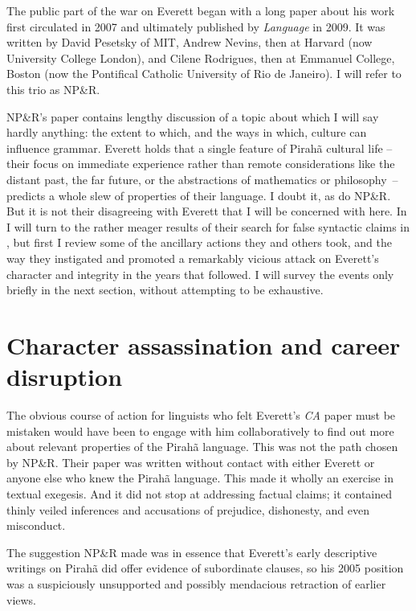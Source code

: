 \documentclass[output=paper,colorlinks,citecolor=brown
]{langscibook}
\begin{document}
The public part of the war on Everett began with a long paper about
his work first circulated in 2007 and ultimately published by
\textit{Language} in 2009. It was written by David Pesetsky of MIT,
Andrew Nevins, then at Harvard (now University College London), and
Cilene Rodrigues, then at Emmanuel College, Boston (now the Pontifical
Catholic University of Rio de Janeiro). I will refer to this trio
as NP\&R.

NP\&R's paper \citep{NevPesRod09a} contains lengthy discussion of a
topic about which I will say hardly anything: the extent to which,
and the ways in which, culture can influence grammar. Everett holds
that a single feature of Pirahã cultural life -- their focus on
immediate experience rather than remote considerations like the distant
past, the far future, or the abstractions of mathematics or philosophy~-- 
predicts a whole slew of properties of their language. I doubt it,
as do NP\&R. But it is not their disagreeing with Everett that I will
be concerned with here. In  I will turn to the rather meager
results of their search for false syntactic claims in \citet{Everett05},
but first I review some of the ancillary actions they and others took,
and the way they instigated and promoted a remarkably vicious attack
on Everett's character and integrity in the years that followed.
I will survey the events only briefly in the next section, without
attempting to be exhaustive.

\section{Character assassination and career disruption}\label{war}

The obvious course of action for linguists who felt Everett's
\textit{CA} paper must be mistaken would have been to engage with
him collaboratively to find out more about relevant properties of the
Pirahã language. This was not the path chosen by NP\&R. Their
paper was written without contact with either Everett or anyone else
who knew the Pirahã language. This made it wholly an exercise in
textual exegesis. And it did not stop at addressing factual claims;
it contained thinly veiled inferences and accusations of prejudice,
dishonesty, and even misconduct.

The suggestion NP\&R made was in essence that Everett's early
descriptive writings on Pirahã did offer evidence of subordinate
clauses, so his 2005 position was a suspiciously unsupported and
possibly mendacious retraction of earlier views.
\end{document}

